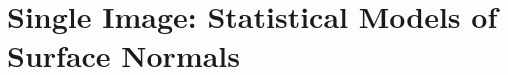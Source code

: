 \chapter{Single Image: Statistical Models of Surface Normals}\label{ch:singl_imag}
\minitoc{}

{
\newcommand{\aepname}{\operatorname{AEP}}
\newcommand{\ipname}{\operatorname{IP}}
\newcommand{\sphername}{\operatorname{SPHER}}
\newcommand{\pganame}{\operatorname{PGA}}
\newcommand{\lsname}{\operatorname{LS}}

\newcommand{\ip}{\Phi_{\ipname} (\bb{x}_k)}
\newcommand{\invip}{{\Phi_{\ipname}}^{-1} (\bb{v}_k)}
\newcommand{\spher}{\Phi_{\sphername} (\bb{x}_k)}
\newcommand{\invspher}{{\Phi_{\sphername}}^{-1} (\bb{v}_k)}
\newcommand{\aep}{\Phi_{\aepname} (\bb{x}_k)}
\newcommand{\invaep}{{\Phi_{\aepname}}^{-1} (\bb{v}_k)}
\newcommand{\pga}{\Phi_{\pganame} (\bb{x}_k)}
\newcommand{\invpga}{{\Phi_{\pganame}}^{-1} (\bb{v}_k)}
\newcommand{\ls}{\Phi_{\lsname} (\bb{x}_k)}
\newcommand{\invls}{{\Phi_{\lsname}}^{-1} (\bb{v}_k)}


\newcommand{\g}{\bb{g}}
\newcommand{\tildeg}{\bb{\tilde{g}}}
\newcommand{\W}{\bb{W}}
\newcommand{\deltap}{\bb{\Delta{} p}}
\newcommand{\x}{\bb{x}}
\newcommand{\I}{\bb{I}}
\newcommand{\GTwo}{\bb{G_2}}
\newcommand{\GOne}{\bb{G_1}}
\newcommand{\J}{\bb{J}}
\newcommand{\zero}{\bb{0}}
\newcommand{\p}{\bb{p}}


}
\stopcontents[chapters]

